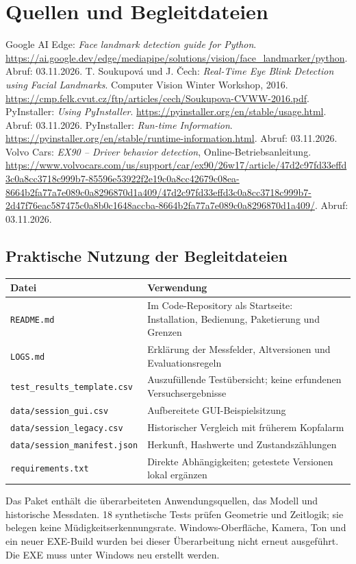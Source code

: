 \documentclass[11pt,a4paper]{article}
\newcommand{\code}[1]{{\small\nolinkurl{#1}}}
\begin{document}
\section*{Quellen und Begleitdateien}
\begin{thebibliography}{9}\small
{} Google AI Edge: \emph{Face landmark detection guide for Python}. \url{https://ai.google.dev/edge/mediapipe/solutions/vision/face_landmarker/python}. Abruf: 03.11.2026.
 T. Soukupová und J. Čech: \emph{Real-Time Eye Blink Detection using Facial Landmarks}. Computer Vision Winter Workshop, 2016. \url{https://cmp.felk.cvut.cz/ftp/articles/cech/Soukupova-CVWW-2016.pdf}.
 PyInstaller: \emph{Using PyInstaller}. \url{https://pyinstaller.org/en/stable/usage.html}. Abruf: 03.11.2026.
 PyInstaller: \emph{Run-time Information}. \url{https://pyinstaller.org/en/stable/runtime-information.html}. Abruf: 03.11.2026.
 Volvo Cars: \emph{EX90 -- Driver behavior detection}, Online-Betriebsanleitung. \url{https://www.volvocars.com/us/support/car/ex90/26w17/article/47d2c97fd33effd3c0a8cc3718c999b7-85596e53922f2e19c0a8cc42679c08ea-8664b2fa77a7e089c0a8296870d1a409/47d2c97fd33effd3c0a8cc3718c999b7-2d47f76eac587475c0a8b0c1648accba-8664b2fa77a7e089c0a8296870d1a409/}. Abruf: 03.11.2026.
\end{thebibliography}
\subsection*{Praktische Nutzung der Begleitdateien}
\begin{tabularx}{\textwidth}{@{}p{57mm}Y@{}}\toprule
Datei & Verwendung\\\midrule
\code{README.md} & Im Code-Repository als Startseite: Installation, Bedienung, Paketierung und Grenzen\\
\code{LOGS.md} & Erklärung der Messfelder, Altversionen und Evaluationsregeln\\
\code{test\_results\_template.csv} & Auszufüllende Testübersicht; keine erfundenen Versuchsergebnisse\\
\code{data/session\_gui.csv} & Aufbereitete GUI-Beispielsitzung\\
\code{data/session\_legacy.csv} & Historischer Vergleich mit früherem Kopfalarm\\
\code{data/session\_manifest.json} & Herkunft, Hashwerte und Zustandszählungen\\
\code{requirements.txt} & Direkte Abhängigkeiten; getestete Versionen lokal ergänzen\\\bottomrule
\end{tabularx}

Das Paket enthält die überarbeiteten Anwendungsquellen, das Modell und historische Messdaten. 18 synthetische Tests prüfen Geometrie und Zeitlogik; sie belegen keine Müdigkeitserkennungsrate. Windows-Oberfläche, Kamera, Ton und ein neuer EXE-Build wurden bei dieser Überarbeitung nicht erneut ausgeführt. Die EXE muss unter Windows neu erstellt werden.
\end{document}

